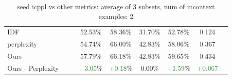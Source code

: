 \begin{table}[t!]
{\begin{tabular}{l|l|c|c|c|c|c|c|c}
    IDF  &   &   & 52.53\% & 58.36\% & 31.70\% & 52.78\% & 0.124 \\
    perplexity  &   &   & 54.74\% & 66.00\% & 42.83\% & 58.06\% & 0.367 \\
    Ours  &   &   & 57.79\% & 66.18\% & 42.83\% & 59.65\% & 0.434 \\
    \hline
    Ours - Perplexity  &   &   & \textcolor{ForestGreen}{+3.05}\% & \textcolor{ForestGreen}{+0.18}\% & 0.00\% & \textcolor{ForestGreen}{+1.59}\% & \textcolor{ForestGreen}{+0.067} \\
    \hline
  \end{tabular}}
  \caption{seed icppl vs other metrics: average of 3 subsets, num of incontext examples: 2}
  \label{tab:icppl vs other metrics: average of 3 subsets, num of incontext examples: 2}
\end{table}
